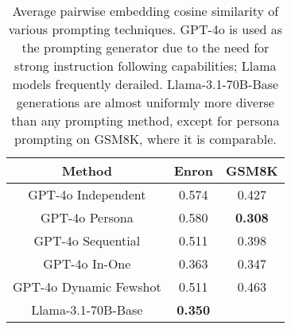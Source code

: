 \begin{table}[t]
\caption{Average pairwise embedding cosine similarity of various prompting techniques. GPT-4o is used as the prompting generator due to the need for strong instruction following capabilities; Llama models frequently derailed. Llama-3.1-70B-Base generations are almost uniformly more diverse than any prompting method, except for persona prompting on GSM8K, where it is comparable.}
\label{prompting-diversity-table}
\vskip 0.15in
\begin{center}
\begin{small}
\begin{sc}
\begin{tabular}{c|cc}
\toprule
Method & Enron & GSM8K \\
\midrule
GPT-4o Independent & 0.574 & 0.427 \\
GPT-4o Persona & 0.580 & \textbf{0.308} \\
GPT-4o Sequential & 0.511  & 0.398 \\
GPT-4o In-One & 0.363 & 0.347 \\
GPT-4o Dynamic Fewshot & 0.511 & 0.463 \\
\midrule
Llama-3.1-70B-Base & \textbf{0.350}  & \begin{sl}{0.313}\end{sl} \\
\bottomrule
\end{tabular}
\end{sc}
\end{small}
\end{center}
\vskip -0.1in
\end{table}
